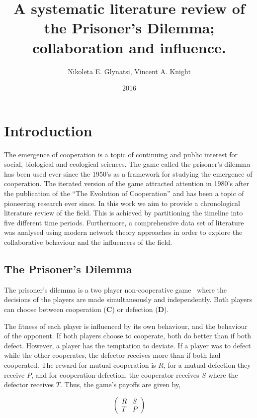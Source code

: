 \documentclass{article}
\title{A systematic literature review of the Prisoner's Dilemma; collaboration and influence.}
\author{Nikoleta E. Glynatsi, Vincent A. Knight}
\date{2016}
\theoremstyle{definition}
\begin{document}
\maketitle

\section{Introduction}\label{section:introduction}

The emergence of cooperation is a topic of continuing and public interest
for social, biological and ecological sciences. The game called the prisoner's
dilemma has been used ever since the 1950's as a framework for studying the emergence
of cooperation. The iterated version of the game attracted attention in 1980's after
the publication of the ``The Evolution of Cooperation'' and has been a topic
of pioneering research ever since. In this work we aim to provide a chronological
literature review of the field. This is achieved by partitioning the timeline into five different
time periods. Furthermore, a comprehensive data set of literature was analysed
using modern network theory approaches in order to explore the collaborative
behaviour and the influencers of the field.

\subsection{The Prisoner's Dilemma}\label{section:prisoners_dilemma}

The prisoner's dilemma is a two player non-cooperative game~\cite{Flood1958} where
the decisions of the players are made simultaneously and independently. Both players
can choose between cooperation (\textbf{C}) or defection (\textbf{D}).

The fitness of each player is influenced by its own behaviour, and the behaviour
of the opponent. If both players choose to cooperate, both do better
than if both defect. However, a player has the temptation to deviate. If a
player was to defect while the other cooperates, the defector receives
more than if both had cooperated. The reward for mutual cooperation is \(R\),
for a mutual defection they receive \(P\), and for cooperation-defection,
the cooperator receives \(S\) where the defector receives \(T\). Thus, the game's
payoffs are given by,

\begin{equation} \label{eq:the_pd_payoffs}
    \begin{pmatrix}
    R & S \\ T & P
    \end{pmatrix}
\end{equation}
\end{document}
